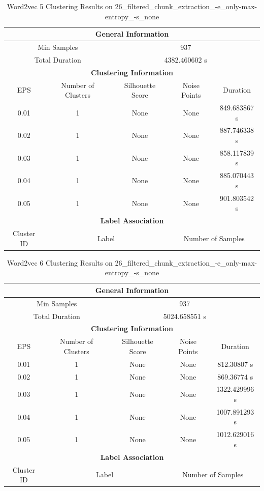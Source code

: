 \begin{longtable}{|c|c|c|c|c|}
\caption{Word2vec 5 Clustering Results on 26\_filtered\_chunk\_extraction\_-e\_only-max-entropy\_-s\_none} \label{tab:26_filtered_chunk_extraction_-e_only-max-entropy_-s_none_word2vec_5_clustering_results}\\
\hline
\multicolumn{5}{|c|}{\textbf{General Information}} \\
\hline
\multicolumn{2}{|c|}{Min Samples} & \multicolumn{3}{c|}{937} \\
\multicolumn{2}{|c|}{Total Duration} & \multicolumn{3}{c|}{4382.460602 s} \\
\hline
\multicolumn{5}{|c|}{\textbf{Clustering Information}} \\
\hline
EPS & Number of Clusters & Silhouette Score & Noise Points & Duration \\
0.01 & 1 & None & None & 849.683867 s\\
0.02 & 1 & None & None & 887.746338 s\\
0.03 & 1 & None & None & 858.117839 s\\
0.04 & 1 & None & None & 885.070443 s\\
0.05 & 1 & None & None & 901.803542 s\\
\hline
\multicolumn{5}{|c|}{\textbf{Label Association}} \\
\hline
Cluster ID & \multicolumn{2}{c|}{Label} & \multicolumn{2}{c|}{Number of Samples} \\
\hline
\end{longtable}


\begin{longtable}{|c|c|c|c|c|}
\caption{Word2vec 6 Clustering Results on 26\_filtered\_chunk\_extraction\_-e\_only-max-entropy\_-s\_none} \label{tab:26_filtered_chunk_extraction_-e_only-max-entropy_-s_none_word2vec_6_clustering_results}\\
\hline
\multicolumn{5}{|c|}{\textbf{General Information}} \\
\hline
\multicolumn{2}{|c|}{Min Samples} & \multicolumn{3}{c|}{937} \\
\multicolumn{2}{|c|}{Total Duration} & \multicolumn{3}{c|}{5024.658551 s} \\
\hline
\multicolumn{5}{|c|}{\textbf{Clustering Information}} \\
\hline
EPS & Number of Clusters & Silhouette Score & Noise Points & Duration \\
0.01 & 1 & None & None & 812.30807 s\\
0.02 & 1 & None & None & 869.36774 s\\
0.03 & 1 & None & None & 1322.429996 s\\
0.04 & 1 & None & None & 1007.891293 s\\
0.05 & 1 & None & None & 1012.629016 s\\
\hline
\multicolumn{5}{|c|}{\textbf{Label Association}} \\
\hline
Cluster ID & \multicolumn{2}{c|}{Label} & \multicolumn{2}{c|}{Number of Samples} \\
\hline
\end{longtable}


